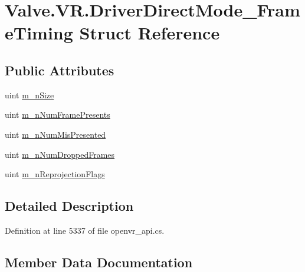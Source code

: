 \hypertarget{struct_valve_1_1_v_r_1_1_driver_direct_mode___frame_timing}{}\section{Valve.\+V\+R.\+Driver\+Direct\+Mode\+\_\+\+Frame\+Timing Struct Reference}
\label{struct_valve_1_1_v_r_1_1_driver_direct_mode___frame_timing}
\subsection*{Public Attributes}
\begin{DoxyCompactItemize}
\item 
uint \mbox{\hyperlink{struct_valve_1_1_v_r_1_1_driver_direct_mode___frame_timing_a727c6323e027b0988e54fcd95c1403a3}{m\+\_\+n\+Size}}
\item 
uint \mbox{\hyperlink{struct_valve_1_1_v_r_1_1_driver_direct_mode___frame_timing_a841ab1d1f468c10bf42ca7e997531239}{m\+\_\+n\+Num\+Frame\+Presents}}
\item 
uint \mbox{\hyperlink{struct_valve_1_1_v_r_1_1_driver_direct_mode___frame_timing_af666081aa9a26142018a1b887334d06e}{m\+\_\+n\+Num\+Mis\+Presented}}
\item 
uint \mbox{\hyperlink{struct_valve_1_1_v_r_1_1_driver_direct_mode___frame_timing_aa63b553cb7f591f0b0558cc27ab67f48}{m\+\_\+n\+Num\+Dropped\+Frames}}
\item 
uint \mbox{\hyperlink{struct_valve_1_1_v_r_1_1_driver_direct_mode___frame_timing_a21ea255cd0b3eefb0983f94a410c364f}{m\+\_\+n\+Reprojection\+Flags}}
\end{DoxyCompactItemize}


\subsection{Detailed Description}


Definition at line 5337 of file openvr\+\_\+api.\+cs.



\subsection{Member Data Documentation}
\mbox{\label{struct_valve_1_1_v_r_1_1_driver_direct_mode___frame_timing_aa63b553cb7f591f0b0558cc27ab67f48}} 
